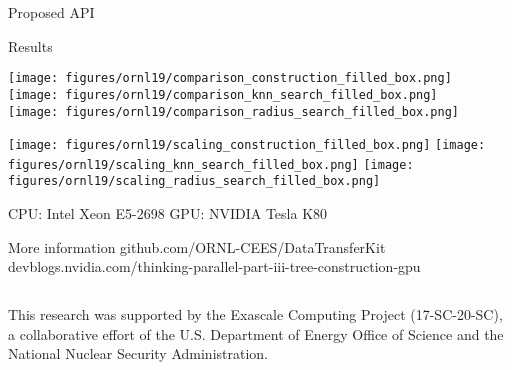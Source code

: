 \documentclass[final,hyperref={pdfpagelabels=false}]{beamer}
\begin{document}
\begin{frame}[t,fragile]
\begin{columns}[t]
\begin{column}{.480\textwidth}
\begin{block}{\centering Proposed API}
\end{block}

\begin{block}{\centering Results}

\texttt{[image: figures/ornl19/comparison\_construction\_filled\_box.png]}
\texttt{[image: figures/ornl19/comparison\_knn\_search\_filled\_box.png]}
\texttt{[image: figures/ornl19/comparison\_radius\_search\_filled\_box.png]}

\texttt{[image: figures/ornl19/scaling\_construction\_filled\_box.png]}
\texttt{[image: figures/ornl19/scaling\_knn\_search\_filled\_box.png]}
\texttt{[image: figures/ornl19/scaling\_radius\_search\_filled\_box.png]}

\begin{center}
  \small
  CPU: Intel Xeon E5-2698 \qquad GPU: NVIDIA Tesla K80
\end{center}

\end{block}

\begin{block}{\centering More information}
  github.com/ORNL-CEES/DataTransferKit
  devblogs.nvidia.com/thinking-parallel-part-iii-tree-construction-gpu
\end{block}

\end{column}

\begin{column}{.015\textwidth}\end{column}

\end{columns}

\vfill

\begin{center}
\footnotesize
This research was supported by the Exascale Computing Project (17-SC-20-SC), a
collaborative effort of the U.S. Department of Energy Office of Science and the
National Nuclear Security Administration.


\end{center}
\end{frame}
\end{document}
